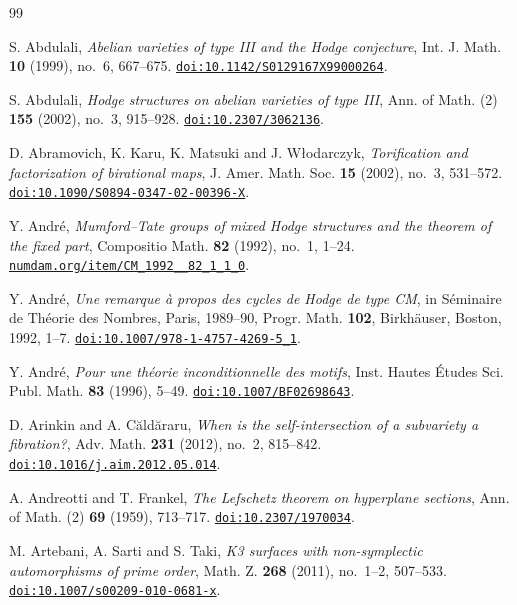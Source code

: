 \documentclass[11pt,reqno]{amsart}
\numberwithin{equation}{section}
\theoremstyle{plain}
\theoremstyle{definition}
\begin{document}
\begin{thebibliography}{99}\raggedright

S. Abdulali,
\emph{Abelian varieties of type III and the Hodge conjecture},
Int. J. Math. \textbf{10} (1999), no.~6, 667--675.
\href{https://doi.org/10.1142/S0129167X99000264}{\nolinkurl{doi:10.1142/S0129167X99000264}}.

S. Abdulali,
\emph{Hodge structures on abelian varieties of type III},
Ann. of Math. (2) \textbf{155} (2002), no.~3, 915--928.
\href{https://doi.org/10.2307/3062136}{\nolinkurl{doi:10.2307/3062136}}.

D. Abramovich, K. Karu, K. Matsuki and J. W\l{}odarczyk,
\emph{Torification and factorization of birational maps},
J. Amer. Math. Soc. \textbf{15} (2002), no.~3, 531--572.
\href{https://doi.org/10.1090/S0894-0347-02-00396-X}{\nolinkurl{doi:10.1090/S0894-0347-02-00396-X}}.

Y. Andr\'e,
\emph{Mumford--Tate groups of mixed Hodge structures and the theorem of the
fixed part},
Compositio Math. \textbf{82} (1992), no.~1, 1--24.
\href{http://www.numdam.org/item/CM_1992__82_1_1_0/}{\nolinkurl{numdam.org/item/CM_1992__82_1_1_0}}.

Y. Andr\'e,
\emph{Une remarque \`a propos des cycles de Hodge de type CM},
in S\'eminaire de Th\'eorie des Nombres, Paris, 1989--90, Progr. Math. \textbf{102}, Birkh\"auser, Boston, 1992, 1--7.
\href{https://doi.org/10.1007/978-1-4757-4269-5_1}{\nolinkurl{doi:10.1007/978-1-4757-4269-5_1}}.

Y. Andr\'e,
\emph{Pour une th\'eorie inconditionnelle des motifs},
Inst. Hautes \'Etudes Sci. Publ. Math. \textbf{83} (1996), 5--49.
\href{https://doi.org/10.1007/BF02698643}{\nolinkurl{doi:10.1007/BF02698643}}.

D. Arinkin and A. C\u{a}ld\u{a}raru,
\emph{When is the self-intersection of a subvariety a fibration?},
Adv. Math. \textbf{231} (2012), no.~2, 815--842.
\href{https://doi.org/10.1016/j.aim.2012.05.014}{\nolinkurl{doi:10.1016/j.aim.2012.05.014}}.

A. Andreotti and T. Frankel,
\emph{The Lefschetz theorem on hyperplane sections},
Ann. of Math. (2) \textbf{69} (1959), 713--717.
\href{https://doi.org/10.2307/1970034}{\nolinkurl{doi:10.2307/1970034}}.

M. Artebani, A. Sarti and S. Taki,
\emph{K3 surfaces with non-symplectic automorphisms of prime order},
Math. Z. \textbf{268} (2011), no.~1--2, 507--533.
\href{https://doi.org/10.1007/s00209-010-0681-x}{\nolinkurl{doi:10.1007/s00209-010-0681-x}}.


\end{thebibliography}
\end{document}
